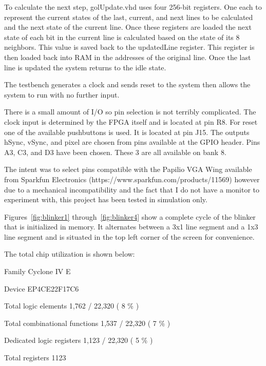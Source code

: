 \documentclass[twoside, letterpaper]{report}
\begin{document}
To calculate the next step, golUpdate.vhd uses four 256-bit registers. One each to represent the current states of the last, current, and next lines to be calculated and the next state of the current line. Once these registers are loaded the next state of each bit in the current line is calculated based on the state of its 8 neighbors. This value is saved back to the updatedLine register. This register is then loaded back into RAM in the addresses of the original line. Once the last line is updated the system returns to the idle state.
\newline
\par
The testbench generates a clock and sends reset to the system then allows the system to run with no further input.
\newline
\par
There is a small amount of I/O so pin selection is not terribly complicated. The clock input is determined by the FPGA itself and is located at pin R8. For reset one of the available pushbuttons is used. It is located at pin J15. The outputs hSync, vSync, and pixel are chosen from pins available at the GPIO header. Pins A3, C3, and D3 have been chosen. These 3 are all available on bank 8.

The intent was to select pins compatible with the Papilio VGA Wing available from Sparkfun Electronics (https://www.sparkfun.com/products/11569) however due to a mechanical incompatibility and the fact that I do not have a monitor to experiment with, this project has been tested in simulation only.
\newline
\par
Figures~\ref{fig:blinker1} through~\ref{fig:blinker4} show a complete cycle of the blinker that is initialized in memory. It alternates between a 3x1 line segment and a 1x3 line segment and is situated in the top left corner of the screen for convenience.
\newline
\par
The total chip utilization is shown below:
\newline
\par
Family	Cyclone IV E

Device	EP4CE22F17C6

Total logic elements	1,762 / 22,320 ( 8 \% )

Total combinational functions	1,537 / 22,320 ( 7 \% )

Dedicated logic registers	1,123 / 22,320 ( 5 \% )

Total registers	1123
\end{document}
